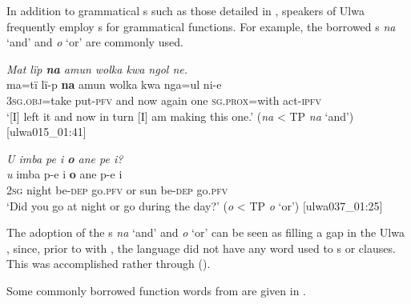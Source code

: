 
In addition to grammatical s such as those detailed in , speakers of Ulwa frequently employ  s for grammatical functions. For example, the borrowed s \textit{na} ‘and’  and \textit{o} ‘or’  are commonly used.

\ea%
    \label{ex:loss:11}
          \textit{Mat lïp \textbf{na} amun wolka kwa ngol ne.}\\
\gll    ma=tï      lï-p      \textbf{na}  amun  wolka  kwa  nga=ul     ni-e\\
    3\textsc{sg.obj}=take  put-\textsc{pfv}  and  now  again  one    \textsc{sg.prox}=with    act-\textsc{ipfv}\\
\glt `[I] left it and now in turn [I] am making this one.’ (\textit{na} < TP \textit{na} ‘and’) [ulwa015\_01:41]
\z

\newpage

\ea%
    \label{ex:loss:12}
          \textit{U imba pe i \textbf{o} ane pe i?}\\
\gll    \textit{u}    imba  p-e    i    \textbf{o}  ane  p-e    i\\
    2\textsc{sg}  night  be\textsc{{}-dep}  go.\textsc{pfv}  or  sun  be\textsc{{}-dep} go.\textsc{pfv}\\
\glt `Did you go at night or go during the day?’ (\textit{o} < TP \textit{o} ‘or’) [ulwa037\_01:25]
\z

The adoption of the  s \textit{na} ‘and’ and \textit{o} ‘or’ can be seen as filling a gap in the Ulwa , since, prior to  with , the language did not have any word used to  s or clauses. This was accomplished rather through  ().

Some commonly borrowed function words from  are given in  .


